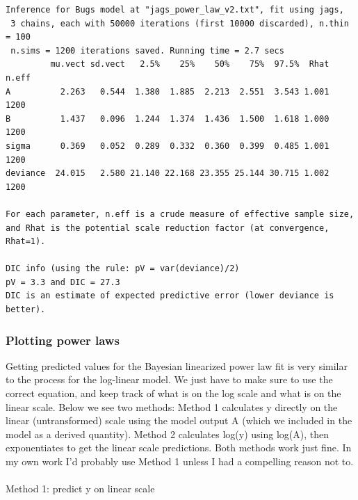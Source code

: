 \documentclass[
  13,
  letterpaper,
]{report}
\makeatletter
\let\oldparagraph\paragraph
\renewcommand{\paragraph}{
    \@ifstar
      \xxxParagraphStar
      \xxxParagraphNoStar
  }
\newcommand{\xxxParagraphStar}[1]{\oldparagraph*{#1}\mbox{}}
\newcommand{\xxxParagraphNoStar}[1]{\oldparagraph{#1}\mbox{}}
\makeatother
\begin{document}
\begin{verbatim}
Inference for Bugs model at "jags_power_law_v2.txt", fit using jags,
 3 chains, each with 50000 iterations (first 10000 discarded), n.thin = 100
 n.sims = 1200 iterations saved. Running time = 2.7 secs
         mu.vect sd.vect   2.5%    25%    50%    75%  97.5%  Rhat n.eff
A          2.263   0.544  1.380  1.885  2.213  2.551  3.543 1.001  1200
B          1.437   0.096  1.244  1.374  1.436  1.500  1.618 1.000  1200
sigma      0.369   0.052  0.289  0.332  0.360  0.399  0.485 1.001  1200
deviance  24.015   2.580 21.140 22.168 23.355 25.144 30.715 1.002  1200

For each parameter, n.eff is a crude measure of effective sample size,
and Rhat is the potential scale reduction factor (at convergence, Rhat=1).

DIC info (using the rule: pV = var(deviance)/2)
pV = 3.3 and DIC = 27.3
DIC is an estimate of expected predictive error (lower deviance is better).
\end{verbatim}

\subsubsection{Plotting power laws}\label{plotting-power-laws}

Getting predicted values for the Bayesian linearized power law fit is
very similar to the process for the log-linear model. We just have to
make sure to use the correct equation, and keep track of what is on the
log scale and what is on the linear scale. Below we see two methods:
Method 1 calculates y directly on the linear (untransformed) scale using
the model output A (which we included in the model as a derived
quantity). Method 2 calculates log(y) using log(A), then exponentiates
to get the linear scale predictions. Both methods work just fine. In my
own work I'd probably use Method 1 unless I had a compelling reason not
to.

\paragraph{Method 1: predict y on linear
scale}\label{method-1-predict-y-on-linear-scale}
\end{document}
